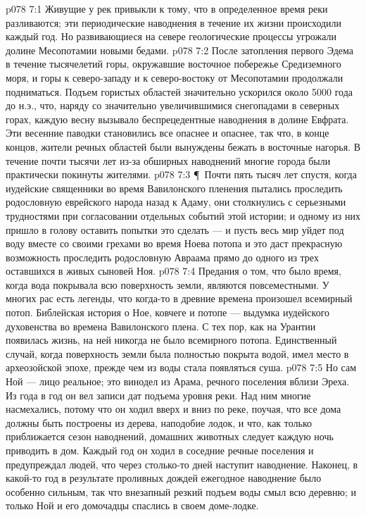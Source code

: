 \vs p078 7:1 Живущие у рек привыкли к тому, что в определенное время реки разливаются; эти периодические наводнения в течение их жизни происходили каждый год. Но развивающиеся на севере геологические процессы угрожали долине Месопотамии новыми бедами.
\vs p078 7:2 После затопления первого Эдема в течение тысячелетий горы, окружавшие восточное побережье Средиземного моря, и горы к северо\hyp{}западу и к северо\hyp{}востоку от Месопотамии продолжали подниматься. Подъем гористых областей значительно ускорился около 5000 года до н.э., что, наряду со значительно увеличившимися снегопадами в северных горах, каждую весну вызывало беспрецедентные наводнения в долине Евфрата. Эти весенние паводки становились все опаснее и опаснее, так что, в конце концов, жители речных областей были вынуждены бежать в восточные нагорья. В течение почти тысячи лет из\hyp{}за обширных наводнений многие города были практически покинуты жителями.
\vs p078 7:3 \P\ Почти пять тысяч лет спустя, когда иудейские священники во время Вавилонского пленения пытались проследить родословную еврейского народа назад к Адаму, они столкнулись с серьезными трудностями при согласовании отдельных событий этой истории; и одному из них пришло в голову оставить попытки это сделать --- и пусть весь мир уйдет под воду вместе со своими грехами во время Ноева потопа и это даст прекрасную возможность проследить родословную Авраама прямо до одного из трех оставшихся в живых сыновей Ноя.
\vs p078 7:4 Предания о том, что было время, когда вода покрывала всю поверхность земли, являются повсеместными. У многих рас есть легенды, что когда\hyp{}то в древние времена произошел всемирный потоп. Библейская история о Ное, ковчеге и потопе --- выдумка иудейского духовенства во времена Вавилонского плена. С тех пор, как на Урантии появилась жизнь, на ней никогда не было всемирного потопа. Единственный случай, когда поверхность земли была полностью покрыта водой, имел место в археозойской эпохе, прежде чем из воды стала появляться суша.
\vs p078 7:5 Но сам Ной --- лицо реальное; это винодел из Арама, речного поселения вблизи Эреха. Из года в год он вел записи дат подъема уровня реки. Над ним многие насмехались, потому что он ходил вверх и вниз по реке, поучая, что все дома должны быть построены из дерева, наподобие лодок, и что, как только приближается сезон наводнений, домашних животных следует каждую ночь приводить в дом. Каждый год он ходил в соседние речные поселения и предупреждал людей, что через столько\hyp{}то дней наступит наводнение. Наконец, в какой\hyp{}то год в результате проливных дождей ежегодное наводнение было особенно сильным, так что внезапный резкий подъем воды смыл всю деревню; и только Ной и его домочадцы спаслись в своем доме\hyp{}лодке.
